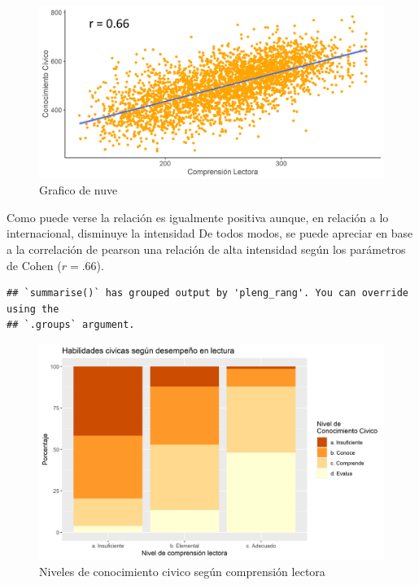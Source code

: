 \documentclass[12pt,twoside]{templates/facsothesis}
\begin{document}
\begin{figure}

{\centering \includegraphics[width=0.8\linewidth]{images/scater} 

}

\caption{Grafico de nuve}\label{fig:unnamed-chunk-9}
\end{figure}

Como puede verse la relación es igualmente positiva aunque, en relación a lo internacional, disminuye la intensidad De todos modos, se puede apreciar en base a la correlación de pearson una relación de alta intensidad según los parámetros de Cohen (\(r= .66\)).

\begin{verbatim}
## `summarise()` has grouped output by 'pleng_rang'. You can override using the
## `.groups` argument.
\end{verbatim}

\begin{figure}

{\centering \includegraphics[width=0.8\linewidth]{images/graficobivariadocategorico} 

}

\caption{Niveles de conocimiento civico según comprensión lectora}\label{fig:unnamed-chunk-11}
\end{figure}
\end{document}
